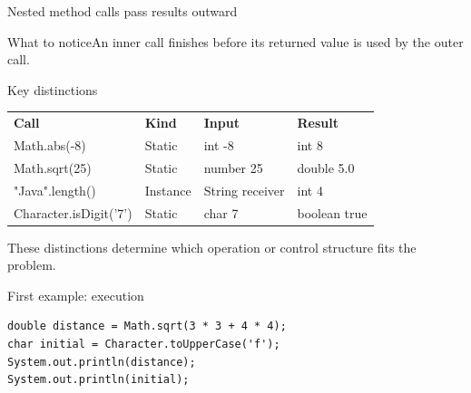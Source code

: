 \documentclass[10pt,aspectratio=169]{beamer}
\begin{document}
\begin{frame}[fragile,t]{Nested method calls pass results outward}
\begin{center}\end{center}
\begin{block}{What to notice}An inner call finishes before its returned value is used by the outer call.\end{block}
\end{frame}
\begin{frame}[fragile,t]{Key distinctions}
\small\renewcommand{\arraystretch}{1.5}
\begin{tabularx}{\textwidth}{>{\raggedright\arraybackslash}X>{\raggedright\arraybackslash}X>{\raggedright\arraybackslash}X>{\raggedright\arraybackslash}X}
\rowcolor{navy}
\color{white}\bfseries Call & \color{white}\bfseries Kind & \color{white}\bfseries Input & \color{white}\bfseries Result\\
Math.abs(-8) & Static & int -8 & int 8\\
Math.sqrt(25) & Static & number 25 & double 5.0\\
"Java".length() & Instance & String receiver & int 4\\
Character.isDigit('7') & Static & char 7 & boolean true\\
\end{tabularx}
\vspace{3mm}\footnotesize These distinctions determine which operation or control structure fits the problem.
\end{frame}

\begin{frame}[fragile,t]{First example: execution}
\begin{lstlisting}
double distance = Math.sqrt(3 * 3 + 4 * 4);
char initial = Character.toUpperCase('f');
System.out.println(distance);
System.out.println(initial);
\end{lstlisting}
\end{frame}
\end{document}
